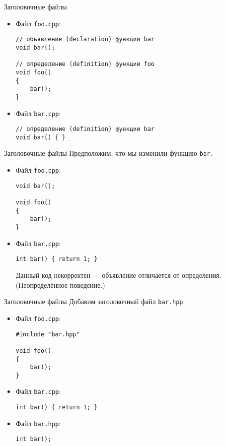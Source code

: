 \documentclass{beamer}
\begin{document}
\begin{frame}[fragile]{Заголовочные файлы}
\begin{itemize}
    \item Файл {\tt foo.cpp}:
{\small \begin{lstlisting}
// объявление (declaration) функции bar
void bar();

// определение (definition) функции foo
void foo()
{
    bar();
}
\end{lstlisting}}

\item Файл {\tt bar.cpp}:
\begin{lstlisting}
// определение (definition) функции bar
void bar() { }
\end{lstlisting}
\end{itemize}
\end{frame}

\begin{frame}[fragile]{Заголовочные файлы}
    Предположим, что мы изменили функцию {\tt bar}.
\begin{itemize}
    \item Файл {\tt foo.cpp}:
{\small \begin{lstlisting}
void bar();

void foo()
{
    bar();
}
\end{lstlisting}}

\item Файл {\tt bar.cpp}:
\begin{lstlisting}
int bar() { return 1; }
\end{lstlisting}

Данный код некорректен — объявление отличается от определения.
(Неопределённое поведение.)
\end{itemize}
\end{frame}

\begin{frame}[fragile]{Заголовочные файлы}
    Добавим заголовочный файл {\tt bar.hpp}.
\begin{itemize}

    \item Файл {\tt foo.cpp}:
\begin{lstlisting}
#include "bar.hpp"

void foo()
{
    bar();
}
\end{lstlisting}

\item Файл {\tt bar.cpp}:
\begin{lstlisting}
int bar() { return 1; }
\end{lstlisting}

    \item Файл {\tt bar.hpp}:
\begin{lstlisting}
int bar();
\end{lstlisting}
\end{itemize}
\end{frame}
\end{document}
